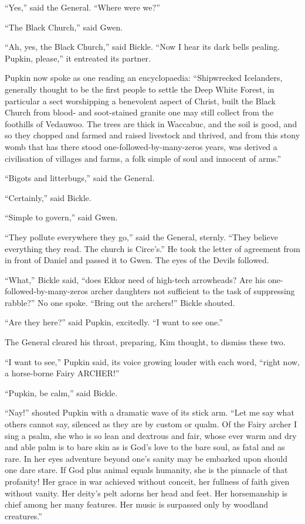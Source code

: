 \documentclass[11pt,a5paper]{article}
\begin{document}
``Yes,'' said the General. ``Where were we?''

``The Black Church,'' said Gwen.

``Ah, yes, the Black Church,'' said Bickle. ``Now I hear its dark bells pealing. Pupkin, please,'' it entreated its partner.

Pupkin now spoke as one reading an encyclopaedia: ``Shipwrecked Icelanders, generally thought to be the first people to settle the Deep White Forest, in particular a sect worshipping a benevolent aspect of Christ, built the Black Church from blood- and soot-stained granite one may still collect from the foothills of Vedauwoo. The trees are thick in Waccabuc, and the soil is good, and so they chopped and farmed and raised livestock and thrived, and from this stony womb that has there stood one-followed-by-many-zeros years, was derived a civilisation of villages and farms, a folk simple of soul and innocent of arms.''

``Bigots and litterbugs,'' said the General.

``Certainly,'' said Bickle.

``Simple to govern,'' said Gwen.

``They pollute everywhere they go,'' said the General, sternly. ``They believe everything they read. The church is Circe's.'' He took the letter of agreement from in front of Daniel and passed it to Gwen. The eyes of the Devils followed.

``What,'' Bickle said, ``does Ekkor need of high-tech arrowheads? Are his one-followed-by-many-zeros archer daughters not sufficient to the task of suppressing rabble?'' No one spoke. ``Bring out the archers!'' Bickle shouted.

``Are they here?'' said Pupkin, excitedly. ``I want to see one.''

The General cleared his throat, preparing, Kim thought, to dismiss these two.

``I want to see,'' Pupkin said, its voice growing louder with each word, ``right now, a horse-borne Fairy ARCHER!''

``Pupkin, be calm,'' said Bickle.

``Nay!'' shouted Pupkin with a dramatic wave of its stick arm. ``Let me say what others cannot say, silenced as they are by custom or qualm. Of the Fairy archer I sing a psalm, she who is so lean and dextrous and fair, whose ever warm and dry and able palm is to bare skin as is God's love to the bare soul, as fatal and as rare. In her eyes adventure beyond one's sanity may be embarked upon should one dare stare. If God plus animal equals humanity, she is the pinnacle of that profanity! Her grace in war achieved without conceit, her fullness of faith given without vanity. Her deity's pelt adorns her head and feet. Her horsemanship is chief among her many features. Her music is surpassed only by woodland creatures.''
\end{document}
